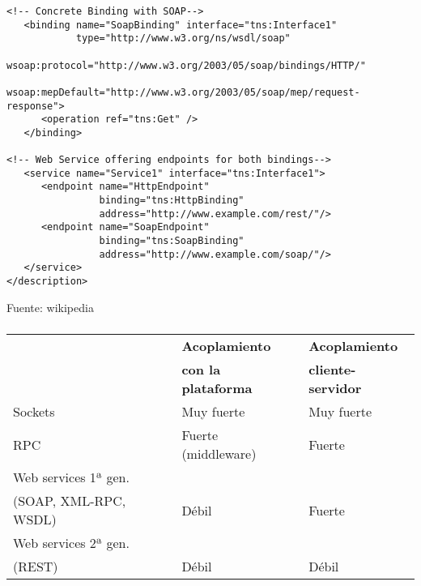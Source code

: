 \documentclass[ucs]{beamer}
\begin{document}
\begin{frame}[fragile]
\frametitle{}


  \begin{scriptsize}
  \begin{verbatim}
<!-- Concrete Binding with SOAP-->
   <binding name="SoapBinding" interface="tns:Interface1"
            type="http://www.w3.org/ns/wsdl/soap"
            wsoap:protocol="http://www.w3.org/2003/05/soap/bindings/HTTP/"
            wsoap:mepDefault="http://www.w3.org/2003/05/soap/mep/request-response">
      <operation ref="tns:Get" />
   </binding>

<!-- Web Service offering endpoints for both bindings-->
   <service name="Service1" interface="tns:Interface1">
      <endpoint name="HttpEndpoint"
                binding="tns:HttpBinding"
                address="http://www.example.com/rest/"/>
      <endpoint name="SoapEndpoint"
                binding="tns:SoapBinding"
                address="http://www.example.com/soap/"/>
   </service>
</description>
  \end{verbatim}
  \end{scriptsize}


  \begin{scriptsize}
  \begin{flushright}
Fuente: wikipedia
  \end{flushright}
  \end{scriptsize}

\end{frame}


\begin{frame}[fragile]
\frametitle{}

\begin{table}[htbp]\center\footnotesize
  \begin{tabular}[h]{|l|l|l|}\hline

 & \bf{Acoplamiento }&  \bf{Acoplamiento}   \\ 
 & \bf{con la plataforma }&  \bf{cliente-servidor}   \\ \hline \hline

Sockets & Muy fuerte & Muy fuerte\\ \hline
RPC & Fuerte (middleware) & Fuerte\\ \hline
Web services 1ª gen. &     &    \\ 
(SOAP, XML-RPC, WSDL) & Débil     & Fuerte    \\ \hline
Web services 2ª gen. &    & \\ 
(REST) & Débil  & Débil\\ \hline


  \end{tabular}
\end{table}



\end{frame}
\end{document}
